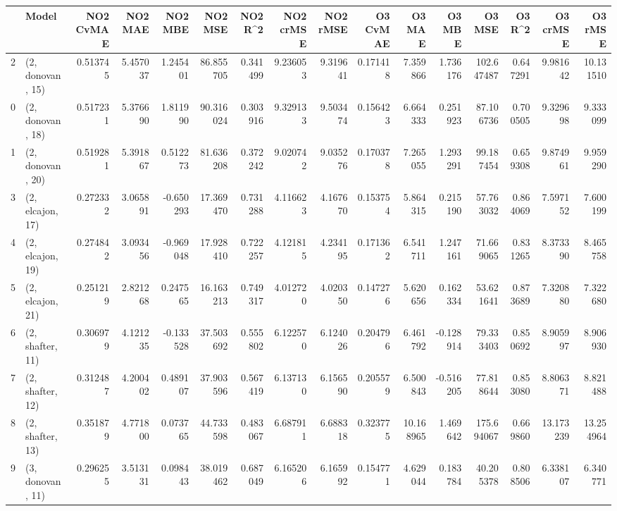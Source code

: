 \begin{tabular}{llrrrrrrrrrrrrrr}
\toprule
{} &             Model &  NO2 CvMAE &   NO2 MAE &   NO2 MBE &     NO2 MSE &   NO2 R\textasciicircum2 &  NO2 crMSE &   NO2 rMSE &  O3 CvMAE &     O3 MAE &    O3 MBE &      O3 MSE &    O3 R\textasciicircum2 &   O3 crMSE &    O3 rMSE \\
\midrule
2  &  (2, donovan, 15) &   0.513745 &  5.457037 &  1.245401 &   86.855705 &  0.341499 &   9.236053 &   9.319641 &  0.171418 &   7.359866 &  1.736176 &  102.647487 &  0.647291 &   9.981642 &  10.131510 \\
0  &  (2, donovan, 18) &   0.517231 &  5.376690 &  1.811990 &   90.316024 &  0.303916 &   9.329133 &   9.503474 &  0.156423 &   6.664333 &  0.251923 &   87.106736 &  0.700505 &   9.329698 &   9.333099 \\
1  &  (2, donovan, 20) &   0.519281 &  5.391867 &  0.512273 &   81.636208 &  0.372242 &   9.020742 &   9.035276 &  0.170378 &   7.265055 &  1.293291 &   99.187454 &  0.659308 &   9.874961 &   9.959290 \\
3  &  (2, elcajon, 17) &   0.272332 &  3.065891 & -0.650293 &   17.369470 &  0.731288 &   4.116623 &   4.167670 &  0.153754 &   5.864315 &  0.215190 &   57.763032 &  0.864069 &   7.597152 &   7.600199 \\
4  &  (2, elcajon, 19) &   0.274842 &  3.093456 & -0.969048 &   17.928410 &  0.722257 &   4.121815 &   4.234195 &  0.171362 &   6.541711 &  1.247161 &   71.669065 &  0.831265 &   8.373390 &   8.465758 \\
5  &  (2, elcajon, 21) &   0.251219 &  2.821268 &  0.247565 &   16.163213 &  0.749317 &   4.012720 &   4.020350 &  0.147276 &   5.620656 &  0.162334 &   53.621641 &  0.873689 &   7.320880 &   7.322680 \\
6  &  (2, shafter, 11) &   0.306979 &  4.121235 & -0.133528 &   37.503692 &  0.555802 &   6.122570 &   6.124026 &  0.204796 &   6.461792 & -0.128914 &   79.333403 &  0.850692 &   8.905997 &   8.906930 \\
7  &  (2, shafter, 12) &   0.312487 &  4.200402 &  0.489107 &   37.903596 &  0.567419 &   6.137130 &   6.156590 &  0.205579 &   6.500843 & -0.516205 &   77.818644 &  0.853080 &   8.806371 &   8.821488 \\
8  &  (2, shafter, 13) &   0.351879 &  4.771800 &  0.073765 &   44.733598 &  0.483067 &   6.687911 &   6.688318 &  0.323775 &  10.168965 &  1.469642 &  175.694067 &  0.669860 &  13.173239 &  13.254964 \\
9  &  (3, donovan, 11) &   0.296255 &  3.513131 &  0.098443 &   38.019462 &  0.687049 &   6.165206 &   6.165992 &  0.154771 &   4.629044 &  0.183784 &   40.205378 &  0.808506 &   6.338107 &   6.340771 \\

\end{tabular}
